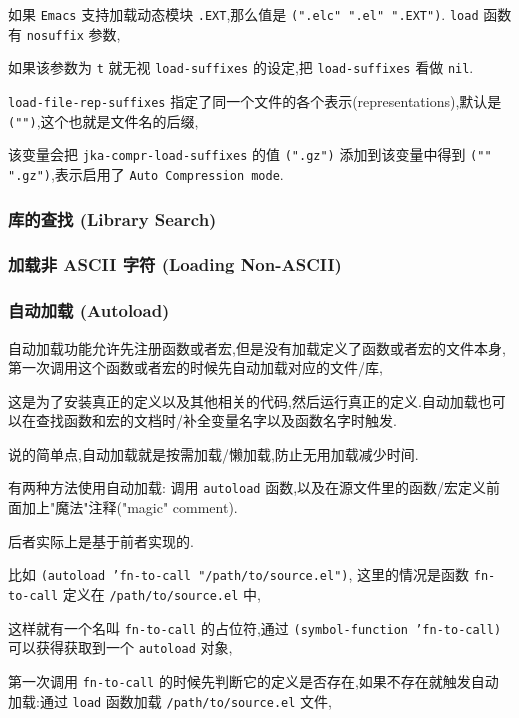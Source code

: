 \documentclass[11pt]{article}
\begin{document}
如果 \texttt{Emacs} 支持加载动态模块 \texttt{.EXT},那么值是 \texttt{(".elc" ".el" ".EXT")}. \texttt{load} 函数有 \texttt{nosuffix} 参数,

如果该参数为 \texttt{t} 就无视 \texttt{load-suffixes} 的设定,把 \texttt{load-suffixes} 看做 \texttt{nil}.

\texttt{load-file-rep-suffixes} 指定了同一个文件的各个表示(representations),默认是 \texttt{("")},这个也就是文件名的后缀,

该变量会把 \texttt{jka-compr-load-suffixes} 的值 \texttt{(".gz")} 添加到该变量中得到 \texttt{("" ".gz")},表示启用了 \texttt{Auto Compression mode}.


\subsubsection{库的查找 (Library Search)}
\label{sec:org85d39a9}

\subsubsection{加载非 ASCII 字符 (Loading Non-ASCII)}
\label{sec:org47f7ebe}

\subsubsection{自动加载 (Autoload)}
\label{sec:orgfa9d108}

自动加载功能允许先注册函数或者宏,但是没有加载定义了函数或者宏的文件本身,第一次调用这个函数或者宏的时候先自动加载对应的文件/库,

这是为了安装真正的定义以及其他相关的代码,然后运行真正的定义.自动加载也可以在查找函数和宏的文档时/补全变量名字以及函数名字时触发.

说的简单点,自动加载就是按需加载/懒加载,防止无用加载减少时间.

有两种方法使用自动加载: 调用 \texttt{autoload} 函数,以及在源文件里的函数/宏定义前面加上"魔法"注释("magic" comment).

后者实际上是基于前者实现的.

比如 \texttt{(autoload 'fn-to-call "/path/to/source.el")}, 这里的情况是函数 \texttt{fn-to-call} 定义在 \texttt{/path/to/source.el} 中,

这样就有一个名叫 \texttt{fn-to-call} 的占位符,通过 \texttt{(symbol-function 'fn-to-call)} 可以获得获取到一个 \texttt{autoload} 对象,

第一次调用 \texttt{fn-to-call} 的时候先判断它的定义是否存在,如果不存在就触发自动加载:通过 \texttt{load} 函数加载 \texttt{/path/to/source.el} 文件,
\end{document}
